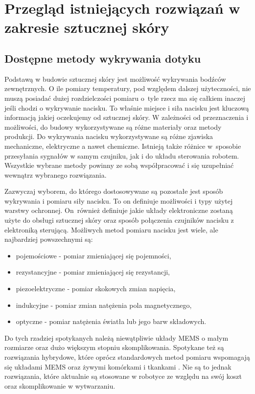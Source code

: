 \newpage
\section{Przegląd istniejących rozwiązań w zakresie sztucznej skóry}
\label{s_przeglad}

\subsection{Dostępne metody wykrywania dotyku}

Podstawą w budowie sztucznej skóry jest możliwość wykrywania bodźców zewnętrznych. O ile pomiary temperatury, pod względem dalszej użyteczności, nie muszą posiadać dużej rozdzielczości pomiaru o~tyle rzecz ma się całkiem inaczej jeśli chodzi o wykrywanie nacisku. To właśnie miejsce i siła nacisku jest kluczową informacją jakiej oczekujemy od sztucznej skóry. W zależności od przeznaczenia i możliwości, do budowy wykorzystywane są różne materiały oraz metody produkcji. Do wykrywania nacisku wykorzystywane są różne zjawiska mechaniczne, elektryczne a nawet chemiczne. Istnieją także różnice w~sposobie przesyłania sygnałów w samym czujniku, jak i do układu sterowania robotem. Wszystkie wybrane metody powinny ze sobą współpracować i się uzupełniać wewnątrz wybranego rozwiązania.

Zazwyczaj wyborem, do którego dostosowywane są pozostałe jest sposób wykrywania i pomiaru siły nacisku. To on definiuje możliwości i typy użytej warstwy ochronnej. On~również definiuje jakie układy elektroniczne zostaną użyte do obsługi sztucznej skóry oraz sposób połączenia czujników nacisku z elektroniką sterującą. Możliwych metod pomiaru nacisku jest wiele, ale najbardziej powszechnymi są:
\begin{itemize}
    \item pojemościowe - pomiar zmieniającej się pojemności,
    \item rezystancyjne - pomiar zmieniającej się rezystancji,
    \item piezoelektryczne - pomiar skokowych zmian napięcia,
    \item indukcyjne - pomiar zmian natężenia pola magnetycznego,
    \item optyczne - pomiar natężenia światła lub jego barw składowych.
\end{itemize}

Do tych rzadziej spotykanych należą niewątpliwie układy MEMS o małym rozmiarze oraz dużo większym stopniu skomplikowania. Spotykane też są rozwiązania hybrydowe, które oprócz standardowych metod pomiaru wspomagają się układami MEMS oraz żywymi komórkami i tkankami \cite{b_article_reviev_tactile_skin}. Nie są to jednak rozwiązania, które aktualnie są stosowane w robotyce ze względu na swój koszt oraz skomplikowanie w wytwarzaniu.


